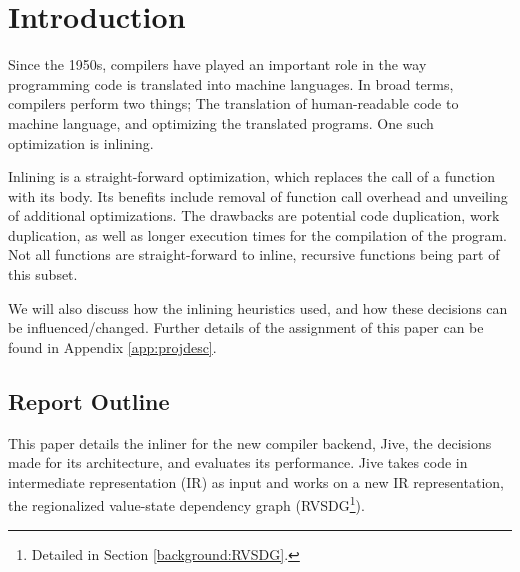 
\section{Introduction}
\label{introduction}

Since the 1950s, compilers have played an important role in the way programming
code is translated into machine languages. In broad terms, compilers perform two
things; The translation of human-readable code to machine language, and
optimizing the translated programs. One such optimization is inlining.


Inlining is a straight-forward optimization, which replaces the call of a
function with its body. Its benefits include removal of function call overhead
and unveiling of additional optimizations. The drawbacks are potential code
duplication, work duplication, as well as longer execution times for the
compilation of the program. Not all functions are straight-forward to inline,
recursive functions being part of this subset.

We will also discuss how the inlining heuristics used, and how these decisions
can be influenced/changed. Further details of the assignment of this paper can
be found in Appendix \ref{app:projdesc}.

\subsection{Report Outline}


This paper details the
inliner for the new compiler backend, Jive, the decisions made for its
architecture, and evaluates its performance. Jive takes code in intermediate
representation (IR) as input and works on a new IR representation, the
regionalized value-state dependency graph (RVSDG\footnote{Detailed in Section
\ref{background:RVSDG}.}).
